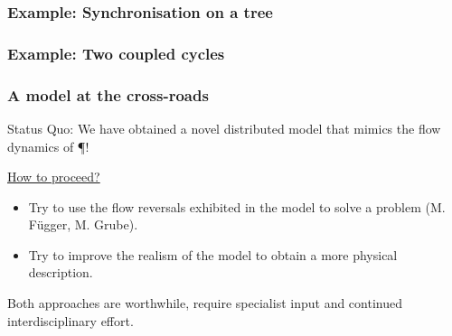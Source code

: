 \documentclass[	hyperref={pdfpagelabels=false}, xcolor=dvipsnames,
		11pt]{beamer}
\begin{document}
\begin{frame}
	\frametitle{Example: Synchronisation on a tree}
		\begin{figure}
			\centering
			\captionsetup[subfloat]{position=bottom,labelformat=empty,font=scriptsize}
		\end{figure}
\end{frame}

\begin{frame}
	\frametitle{Example: Two coupled cycles}
		\begin{figure}
			\centering
			\captionsetup[subfloat]{position=bottom,labelformat=empty,font=scriptsize}
		\end{figure}
\end{frame}

\begin{frame}
	\frametitle{A model at the cross-roads}

	\begin{block}{Status Quo:}
		We have obtained a novel distributed model that mimics the flow dynamics of \P!
	\end{block}
	\begin{alertblock}{\underline{How to proceed?}}
		\begin{itemize}
			\item Try to use the flow reversals exhibited in the model to solve a problem (M. Függer, M. Grube).
			\item Try to improve the realism of the model to obtain a more physical description.
		\end{itemize}
	\end{alertblock}

	Both approaches are worthwhile, require specialist input and continued interdisciplinary effort.
\end{frame}
\end{document}
